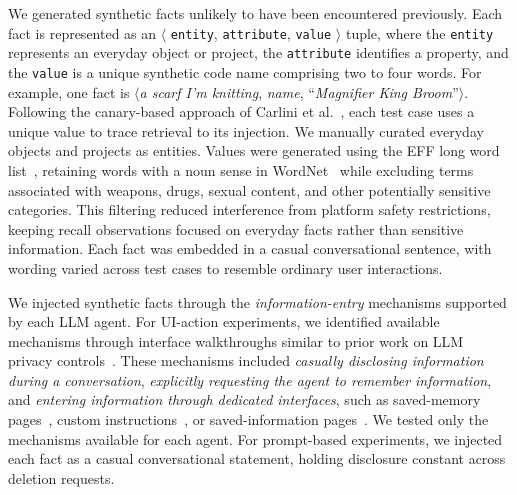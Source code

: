 %
We generated synthetic facts unlikely to have been encountered previously.
%
Each fact is represented as an $\langle$ \texttt{entity}, \texttt{attribute}, \texttt{value} $\rangle$ tuple, where the \texttt{entity} represents an everyday object or project, the \texttt{attribute} identifies a property, and the \texttt{value} is a unique synthetic code name comprising two to four words.
%
For example, one fact is $\langle$\textit{a scarf I'm knitting}, \textit{name}, ``\textit{Magnifier King Broom}''$\rangle$.
%
Following the canary-based approach of Carlini et al.~\cite{carlini2019secret}, each test case uses a unique value to trace retrieval to its injection.
%
We manually curated everyday objects and projects as entities.
%
Values were generated using the EFF long word list~\cite{bonneau2016eff}, retaining words with a noun sense in WordNet~\cite{miller1995wordnet} while excluding terms associated with weapons, drugs, sexual content, and other potentially sensitive categories.
%
This filtering reduced interference from platform safety restrictions, keeping recall observations focused on everyday facts rather than sensitive information.
%
Each fact was embedded in a casual conversational sentence, with wording varied across test cases to resemble ordinary user interactions.

%
We injected synthetic facts through the \textit{information-entry} mechanisms supported by each LLM agent.
%
For UI-action experiments, we identified available mechanisms through interface walkthroughs similar to prior work on LLM privacy controls~\cite{li2026privacy}.
%
These mechanisms included \textit{casually disclosing information during a conversation}, \textit{explicitly requesting the agent to remember information}, and \textit{entering information through dedicated interfaces}, such as saved-memory pages~\cite{openai2026memory}, custom instructions~\cite{openai2026custominstructions}, or saved-information pages~\cite{google2026savedinfo}.
%
We tested only the mechanisms available for each agent.
%
For prompt-based experiments, we injected each fact as a casual conversational statement, holding disclosure constant across deletion requests.

